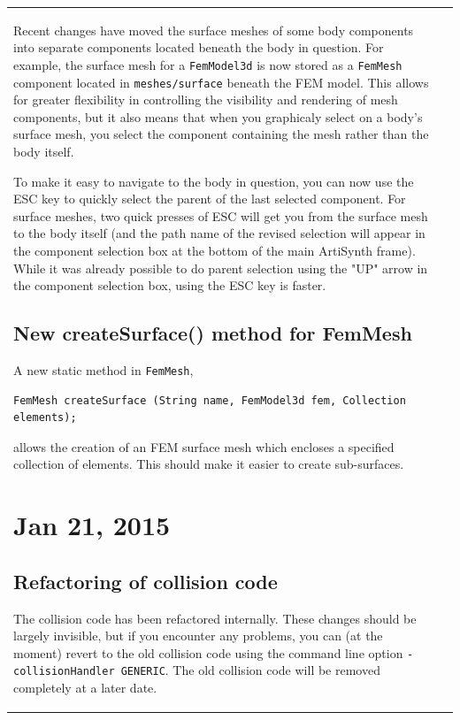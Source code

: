 \documentclass{article}
\begin{document}
\begin{tabular}{ll}
Recent changes have moved the surface meshes of some body components
into separate components located beneath the body in question. For
example, the surface mesh for a {\tt FemModel3d} is now stored as a
{\tt FemMesh} component located in {\tt meshes/surface} beneath the
FEM model. This allows for greater flexibility in controlling the
visibility and rendering of mesh components, but it also means that
when you graphicaly select on a body's surface mesh, you select the
component containing the mesh rather than the body itself.

To make it easy to navigate to the body in question, you can now use
the ESC key to quickly select the parent of the last selected
component.  For surface meshes, two quick presses of ESC will get you
from the surface mesh to the body itself (and the path name of the
revised selection will appear in the component selection box at the
bottom of the main ArtiSynth frame). While it was already possible to
do parent selection using the "UP" arrow in the component selection
box, using the ESC key is faster.

\subsection*{New createSurface() method for FemMesh}

A new static method in {\tt FemMesh},
%
\begin{lstlisting}[]
   FemMesh createSurface (String name, FemModel3d fem, Collection elements);
\end{lstlisting}
%
allows the creation of an FEM surface mesh which encloses a specified
collection of elements. This should make it easier to create
sub-surfaces.

\section*{Jan 21, 2015}

\subsection*{Refactoring of collision code}

The collision code has been refactored internally.  These changes
should be largely invisible, but if you encounter any problems, you
can (at the moment) revert to the old collision code using the command
line option {\tt -collisionHandler GENERIC}. The old collision code
will be removed completely at a later date.


\end{tabular}
\end{document}
